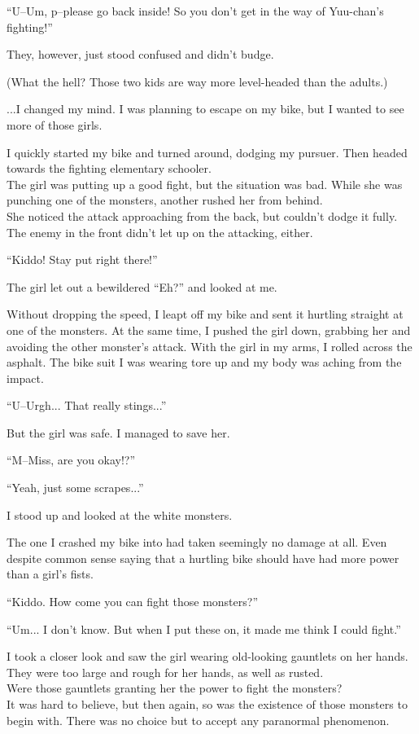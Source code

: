 ``U--Um, p--please go back inside! So you don't get in the way of Yuu-chan's fighting!''

They, however, just stood confused and didn't budge.

(What the hell? Those two kids are way more level-headed than the adults.)

...I changed my mind. I was planning to escape on my bike, but I wanted to see more of those girls.

I quickly started my bike and turned around, dodging my pursuer. Then headed towards the fighting elementary schooler. \\
The girl was putting up a good fight, but the situation was bad. While she was punching one of the monsters, another rushed her from behind. \\
She noticed the attack approaching from the back, but couldn't dodge it fully. The enemy in the front didn't let up on the attacking, either.

``Kiddo! Stay put right there!''

The girl let out a bewildered ``Eh?'' and looked at me.

Without dropping the speed, I leapt off my bike and sent it hurtling straight at one of the monsters. At the same time, I pushed the girl down, grabbing her and avoiding the other monster's attack. With the girl in my arms, I rolled across the asphalt. The bike suit I was wearing tore up and my body was aching from the impact.

``U--Urgh... That really stings...''

But the girl was safe. I managed to save her.

``M--Miss, are you okay!?''

``Yeah, just some scrapes...''

I stood up and looked at the white monsters.

The one I crashed my bike into had taken seemingly no damage at all. Even despite common sense saying that a hurtling bike should have had more power than a girl's fists.

``Kiddo. How come you can fight those monsters?''

``Um... I don't know. But when I put these on, it made me think I could fight.''

I took a closer look and saw the girl wearing old-looking gauntlets on her hands. They were too large and rough for her hands, as well as rusted. \\
Were those gauntlets granting her the power to fight the monsters? \\
It was hard to believe, but then again, so was the existence of those monsters to begin with. There was no choice but to accept any paranormal phenomenon.

